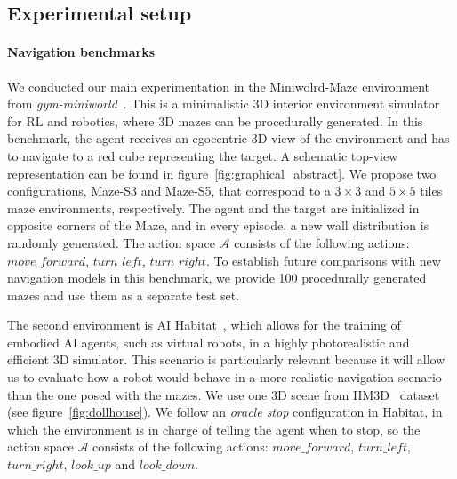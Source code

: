 \subsection{Experimental setup}\label{subsec:experimental-setup}

\paragraph*{Navigation benchmarks}
We conducted our main experimentation in the Miniwolrd-Maze environment from \textit{gym-miniworld}~\cite{gym_miniworld}.
This is a minimalistic 3D interior environment simulator for RL and robotics, where 3D mazes can be procedurally generated.
In this benchmark, the agent receives an egocentric 3D view of the environment and has to navigate to a red cube representing the target.
A schematic top-view representation can be found in figure~\ref{fig:graphical_abstract}.
We propose two configurations, Maze-S3 and Maze-S5, that correspond to a $3\times3$ and $5\times5$ tiles maze environments, respectively.
The agent and the target are initialized in opposite corners of the Maze, and in every episode, a new wall distribution is randomly generated.
The action space $\mathcal{A}$ consists of the following actions: $move\_forward$, $turn\_left$, $turn\_right$.
To establish future comparisons with new navigation models in this benchmark, we provide 100 procedurally generated mazes and use them as a separate test set.


The second environment is AI Habitat~\cite{szot2021}, which allows for the training of embodied AI agents, such as virtual robots, in a highly photorealistic and efficient 3D simulator.
This scenario is particularly relevant because it will allow us to evaluate how a robot would behave in a more realistic navigation scenario than the one posed with the mazes.
We use one 3D scene from HM3D~\cite{ramakrishnan2021} dataset (see figure~\ref{fig:dollhouse}).
We follow an \textit{oracle stop} configuration in Habitat, in which the environment is in charge of telling the agent when to stop, so the action space $\mathcal{A}$ consists of the following actions: $move\_forward$, $turn\_left$, $turn\_right$, $look\_up$ and $look\_down$.

